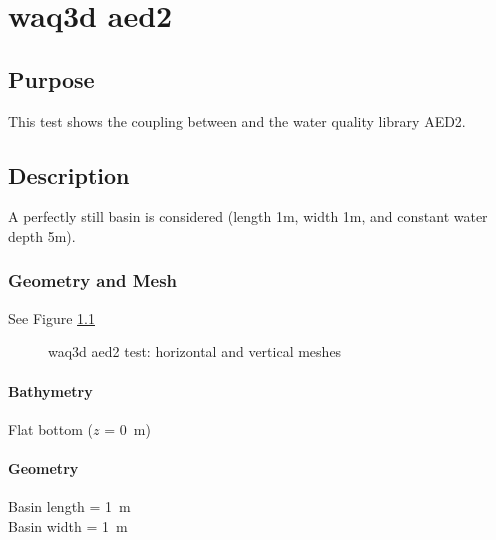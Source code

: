 
\chapter{waq3d aed2}
%
%
\section{Purpose}
%
This test shows the coupling between  and the water quality library AED2.
%
\section{Description}
%
A perfectly still basin is considered (length 1m, width 1m, and constant water depth 5m).


%
%
%
%
%
%
%
\subsection{Geometry and Mesh}
%
See Figure \ref{fig:mesh}

\begin{figure} [H]
\centering
{}
 \caption{waq3d aed2 test: horizontal and vertical meshes}
 \label{fig:mesh}
\end{figure}
%
\subsubsection{Bathymetry}
%
Flat bottom ($z$ = 0~m)
%
\subsubsection{Geometry}
%
Basin length = 1~m\\
Basin width = 1~m
%
